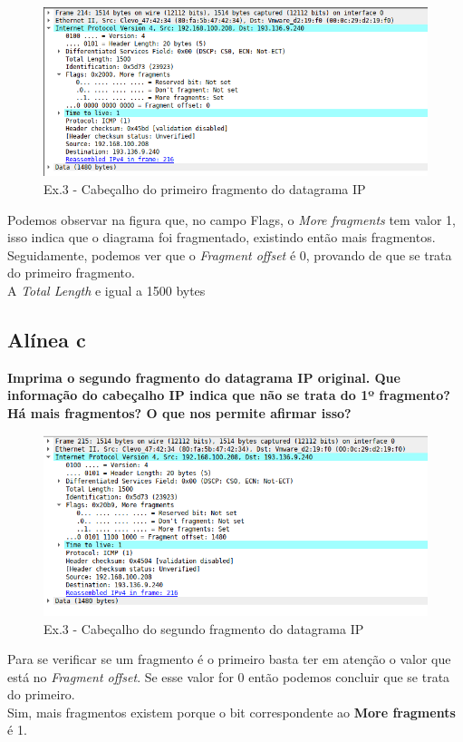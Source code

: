 \documentclass[a4paper]{report}
\begin{document}
\begin{figure}[H]
    \centering 
    \includegraphics[width=\textwidth]{images/fragmentDatagramaIpEx3.png}
    \caption{Ex.3 - Cabeçalho do primeiro fragmento do datagrama IP}
    \label{fig:fragmentDatagramaIpEx3}
\end{figure}
Podemos observar na figura que, no campo Flags, o \textit{More fragments} tem
valor 1, isso indica que o diagrama foi fragmentado, existindo então mais
fragmentos.\\
Seguidamente, podemos ver que o \textit{Fragment offset} é 0, provando de que se
trata do primeiro fragmento.\\
A \textit{Total Length} e igual a 1500 bytes

\subsection{Alínea c}
\textbf{Imprima o segundo fragmento do datagrama IP original. Que
informação do cabeçalho IP indica que não se trata do 1º fragmento? 
Há mais fragmentos? O que nos permite afirmar isso?}

\begin{figure}[H]
    \centering 
    \includegraphics[width=\textwidth]{images/fragment2DatagramaIpEx3.png}
    \caption{Ex.3 - Cabeçalho do segundo fragmento do datagrama IP}
    \label{fig:fragment2DatagramaIpEx3}
\end{figure}
Para se verificar se um fragmento é o primeiro basta ter em atenção o valor
que está no \textit{Fragment offset}. Se esse valor for 0 então podemos concluir
que se trata do primeiro.\\
Sim, mais fragmentos existem porque o bit correspondente ao \textbf{More
fragments} é 1.
\end{document}
